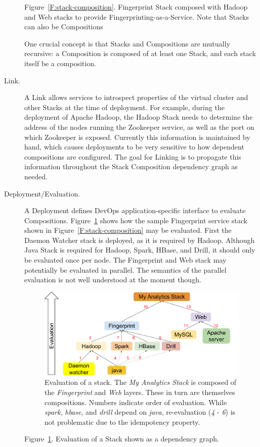 \documentclass[9pt,twocolumn,twoside]{styles/osajnl}
\begin{document}
\begin{description}
  Figure~\ref{F:stack-composition}. Fingerprint Stack composed with Hadoop and Web stacks to
  provide Fingerprinting-as-a-Service. Note that Stacks can also be
  Compositions


  One crucial concept is that Stacks and Compositions are mutually
  recursive: a Composition is composed of at least one Stack, and each
  stack itself be a composition.


\item[Link.] A Link allows services to introspect properties of the
  virtual cluster and other Stacks at the time of deployment. For
  example, during the deployment of Apache Hadoop, the Hadoop Stack
  needs to determine the address of the nodes running the Zookeeper
  service, as well as the port on which Zookeeper is
  exposed. Currently this information is maintained by hand, which
  causes deployments to be very sensitive to how dependent
  compositions are configured. The goal for Linking is to propagate
  this information throughout the Stack Composition dependency graph
  as needed.


\item[Deployment/Evaluation.] A Deployment defines DevOps
  application-specific interface to evaluate Compositions.
  Figure~\ref{F:stack-graph} shows how the sample Fingerprint service
  stack shown in Figure~\ref{F:stack-composition} may be
  evaluated. First the Daemon Watcher stack is deployed, as it is
  required by Hadoop. Although Java Stack is required for Hadoop,
  Spark, HBase, and Drill, it should only be evaluated once per
  node. The Fingerprint and Web stack may potentially be evaluated in
  parallel. The semantics of the parallel evaluation is not well
  understood at the moment though.


  
  \begin{figure}
    \centering
    \includegraphics[width=1\columnwidth]{images/cloudmesh-stack-graph.pdf}
    \caption{Evaluation of a stack.
      The {\it My Analytics Stack} is composed of the {\it Fingerprint} and {\it Web} layers.
      These in turn are themselves compositions.
      Numbers indicate order of evaluation. While {\it spark}, {\it hbase}, and {\it drill} depend on {\it java}, re-evaluation (\textit{4} - \textit{6}) is not problematic due to the idempotency property.
      \label{F:stack-graph}}
  \end{figure}


  Figure~\ref{F:stack-graph}. Evaluation of a Stack shown as a dependency graph.


\end{description}
\end{document}

